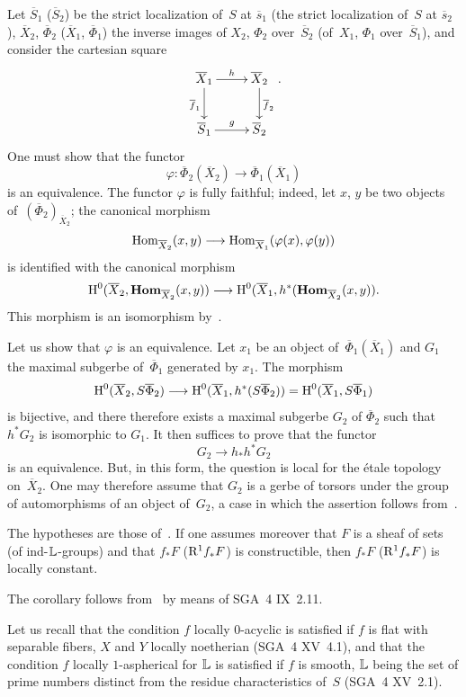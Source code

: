 Let $\overline{S}_1$ (\resp $\overline{S}_2$) be the strict
localization of~$S$ at $\overline{s}_1$ (\resp the strict localization of~$S$
at $\overline{s}_2$), $\overline{X}_2$, $\overline{\Phi}_2$
(\resp $\overline{X}_1$, $\overline{\Phi}_1$) the inverse images of
$X_2$, $\Phi_2$ over~$\overline{S}_2$ (\resp of~$X_1$, $\Phi_1$ over~$\overline{S}_1$), and consider the cartesian square
$$
\xymatrix{ \overline{X}_1 \ar[r]^h \ar[d]_{\overline{f}_1} &
\overline{X}_2 \ar[d]^{\overline{f}_2} \\ \overline{S}_1 \ar[r]^g &
\overline{S}_2 }
\text{.}
$$
One must show that the functor
$$
\varphi \colon \overline{\Phi}_2(\overline{X}_2) \to \overline{\Phi}_1
(\overline{X}_1)
$$
is an equivalence. The functor $\varphi$ is fully
faithful; indeed, let
$x$, $y$ be two objects of~$(\overline{\Phi}_2)_{\overline{X}_2}$;
the canonical morphism
$$
\Hom_{\overline{X}_2}(x,y) \to
\Hom_{\overline{X}_1}(\varphi(x),\varphi(y))
$$
is identified with the canonical morphism
$$
\H^0(\overline{X}_2, \SheafHom_{\overline{X}_2}(x,y)) \to
\H^0(\overline{X}_1,h^*(\SheafHom_{\overline{X}_2}(x,y)) \text{.}
$$
This morphism is an isomorphism by~.

Let us show that $\varphi$ is an equivalence. Let $x_1$ be an object
of~$\overline{\Phi}_1(\overline{X}_1)$ and $G_1$ the maximal subgerbe
of~$\overline{\Phi}_1$ generated by $x_1$. The morphism
$$
\H^0(\overline{X}_2, S\overline{\Phi}_2) \to \H^0(\overline{X}_1,
h^*(S \overline{\Phi}_2)) =
\H^0(\overline{X}_1,S\overline{\Phi}_1)
$$
is bijective, and there therefore exists a maximal subgerbe $G_2$ of
$\overline{\Phi}_2$ such that $h^* G_2$ is isomorphic to
$G_1$. It then suffices to prove that the functor
$$
G_2 \to h_* h^* G_2
$$
is an equivalence. But, in this form, the question is
local for the \'etale topology on~$\overline{X}_2$. One may therefore
assume that $G_2$ is a gerbe of torsors under the group of
automorphisms of an object of~$G_2$, a case in which the assertion follows
from~.

\begin{corollary}
\label{XIII.1.16}
The hypotheses are those of~. If one assumes
moreover that $F$ is a sheaf of sets (\resp of ind-$\mathbb{L}$-groups)
and that $f_* F$ (\resp $\mathrm{R}^1 f_* F$) is constructible, then
$f_* F$ (\resp $\mathrm{R}^1 f_* F$) is locally constant.
\end{corollary}

The corollary follows from~ by means of SGA~4
IX~2.11.

\begin{remark}
\label{XIII.1.17}
Let us recall that the condition $f$ locally $0$-acyclic is satisfied
if $f$ is flat with separable fibers, $X$ and $Y$ locally
noetherian (SGA~4 XV~4.1), and that the condition $f$ locally
$1$-aspherical
for $\mathbb{L}$ is satisfied if $f$ is smooth, $\mathbb{L}$ being the set
of prime numbers distinct from the residue
characteristics of~$S$ (SGA~4 XV~2.1).
\end{remark}
